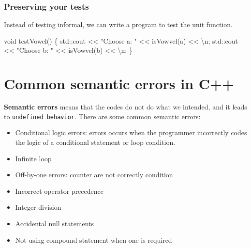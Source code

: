 \documentclass[
  letterpaper,
  DIV=11,
  numbers=noendperiod]{scrreprt}
\newenvironment{Shaded}{\begin{snugshade}}{\end{snugshade}}
\newcommand{\ErrorTok}[1]{\textcolor[rgb]{0.68,0.00,0.00}{#1}}
\newcommand{\FunctionTok}[1]{\textcolor[rgb]{0.28,0.35,0.67}{#1}}
\newcommand{\NormalTok}[1]{\textcolor[rgb]{0.00,0.23,0.31}{#1}}
\newcommand{\SpecialCharTok}[1]{\textcolor[rgb]{0.37,0.37,0.37}{#1}}
\newcommand{\StringTok}[1]{\textcolor[rgb]{0.13,0.47,0.30}{#1}}
\providecommand{\tightlist}{%
  \setlength{\itemsep}{0pt}\setlength{\parskip}{0pt}}\usepackage{longtable,booktabs,array}
\begin{document}
\hypertarget{preserving-your-tests}{%
\subsubsection{Preserving your tests}\label{preserving-your-tests}}

Instead of testing informal, we can write a program to test the unit
function.

\begin{Shaded}
\begin{Highlighting}[]
\NormalTok{void }\FunctionTok{testVowel}\NormalTok{()}
\NormalTok{\{}
\NormalTok{    std}\SpecialCharTok{::}\NormalTok{cout }\SpecialCharTok{\textless{}}\ErrorTok{\textless{}} \StringTok{"Choose \textquotesingle{}a\textquotesingle{}: "} \SpecialCharTok{\textless{}}\ErrorTok{\textless{}} \FunctionTok{isVowvel}\NormalTok{(}\StringTok{\textquotesingle{}a\textquotesingle{}}\NormalTok{) }\SpecialCharTok{\textless{}}\ErrorTok{\textless{}} \StringTok{\textquotesingle{}}\SpecialCharTok{\textbackslash{}n}\StringTok{\textquotesingle{}}\NormalTok{;}
\NormalTok{    std}\SpecialCharTok{::}\NormalTok{cout }\SpecialCharTok{\textless{}}\ErrorTok{\textless{}} \StringTok{"Choose \textquotesingle{}b\textquotesingle{}: "} \SpecialCharTok{\textless{}}\ErrorTok{\textless{}} \FunctionTok{isVowvel}\NormalTok{(}\StringTok{\textquotesingle{}b\textquotesingle{}}\NormalTok{) }\SpecialCharTok{\textless{}}\ErrorTok{\textless{}} \StringTok{\textquotesingle{}}\SpecialCharTok{\textbackslash{}n}\StringTok{\textquotesingle{}}\NormalTok{;}
\NormalTok{\}}
\end{Highlighting}
\end{Shaded}

\hypertarget{common-semantic-errors-in-c}{%
\section{Common semantic errors in
C++}\label{common-semantic-errors-in-c}}

\textbf{Semantic errors} means that the codes do not do what we
intended, and it leads to \texttt{undefined\ behavior}. There are some
common semantic errors:

\begin{itemize}
\tightlist
\item
  Conditional logic errors: errors occurs when the programmer
  incorrectly codes the logic of a conditional statement or loop
  condition.
\item
  Infinite loop
\item
  Off-by-one errors: counter are not correctly condition
\item
  Incorrect operator precedence
\item
  Integer division
\item
  Accidental null statements
\item
  Not using compound statement when one is required
\end{itemize}
\end{document}
